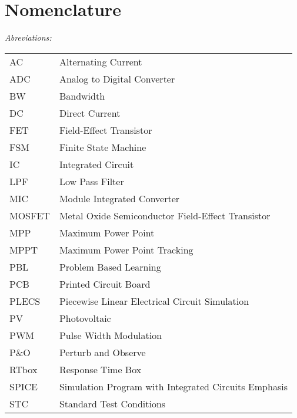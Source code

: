 \chapter*{Nomenclature}

\vspace{-10mm} %
\textit{Abreviations:}\newline
\begin{tabular}{ll} %
AC & Alternating Current\\
ADC & Analog to Digital Converter \\
BW & Bandwidth \\
DC & Direct Current\\
FET & Field-Effect Transistor\\
FSM & Finite State Machine \\
IC & Integrated Circuit\\
LPF & Low Pass Filter\\
MIC & Module Integrated Converter\\
MOSFET & Metal Oxide Semiconductor Field-Effect Transistor\\
MPP & Maximum Power Point\\
MPPT & Maximum Power Point Tracking\\
PBL & Problem Based Learning\\
PCB & Printed Circuit Board\\
PLECS & Piecewise Linear Electrical Circuit Simulation\\
PV & Photovoltaic\\
PWM & Pulse Width Modulation\\
P\&O & Perturb and Observe\\
RTbox & Response Time Box \\
SPICE & Simulation Program with Integrated Circuits Emphasis \\
STC & Standard Test Conditions\\
\end{tabular}

\vspace{5mm} %

